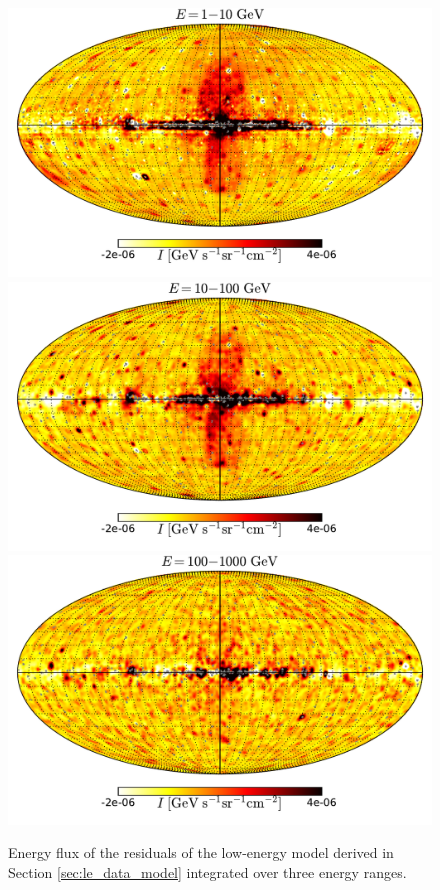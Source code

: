 \begin{figure}[t]
\includegraphics[width=\threepic\textwidth]{plots/Mollweide_LowE_0p3-1p0GeV_flux_source_range_0.pdf}
\includegraphics[width=\threepic\textwidth]{plots/Mollweide_LowE_0p3-1p0GeV_flux_source_range_1.pdf}
\includegraphics[width=\threepic\textwidth]{plots/Mollweide_LowE_0p3-1p0GeV_flux_source_range_2.pdf}
\caption{Energy flux of the residuals of the low-energy model derived in Section \ref{sec:le_data_model}
integrated over three energy ranges. }
\label{fig:Maps_lowE}
\end{figure}


